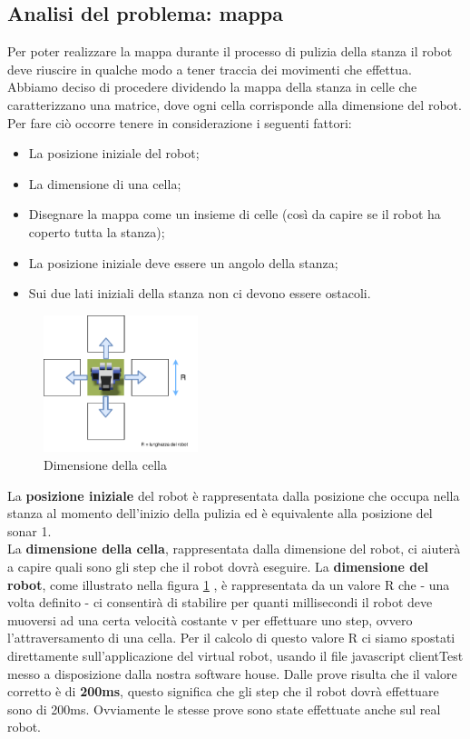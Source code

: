 \documentclass{llncs}
\begin{document}
\subsection{Analisi del problema: mappa}
\label{AnalisiReq5}
Per poter realizzare la mappa durante il processo di pulizia della stanza il robot deve riuscire in qualche modo a tener traccia dei movimenti che effettua.\\
Abbiamo deciso di procedere dividendo la mappa della stanza in celle che caratterizzano una matrice, dove ogni cella corrisponde alla dimensione del robot. Per fare ci\`o occorre tenere in considerazione i seguenti fattori:
\begin{itemize}
    \item La posizione iniziale del robot;
    \item La dimensione di una cella;
    \item Disegnare la mappa come un insieme di celle (cos\`i da capire se il robot ha coperto tutta la stanza);
    \item La posizione iniziale deve essere un angolo della stanza; \label{cons1}
    \item Sui due lati iniziali della stanza non ci devono essere ostacoli.\label{cons2}
\end{itemize}
\begin{figure}
    \centering
    \includegraphics[width=0.4\textwidth]{Immagini/Requisito5/RobotDirections.png}
    \caption{Dimensione della cella}
    \label{fig:R5DimCella}
\end{figure}
La \textbf{posizione iniziale} del robot \`e rappresentata dalla posizione che occupa nella stanza al momento dell'inizio della pulizia ed \`e equivalente alla posizione del sonar 1.\\
La \textbf{dimensione della cella}, rappresentata dalla dimensione del robot, ci aiuter\`a a capire quali sono gli step che il robot dovr\`a eseguire. La \textbf{dimensione del robot}, come illustrato nella figura \hyperref[ig:R5DimCella]{\ref{fig:R5DimCella}} , \`e rappresentata da un valore R che - una volta definito - ci consentir\`a di stabilire per quanti millisecondi il robot deve muoversi ad una certa velocit\`a costante v per effettuare uno step, ovvero l'attraversamento di una cella. Per il calcolo di questo valore R ci siamo spostati direttamente sull’applicazione del virtual robot, usando il file javascript clientTest messo a disposizione dalla nostra software house. Dalle prove risulta che il valore corretto \`e di \textbf{200ms}, questo significa che gli step che il robot dovr\`a effettuare sono di 200ms. Ovviamente le stesse prove sono state effettuate anche sul real robot.\\
\end{document}
